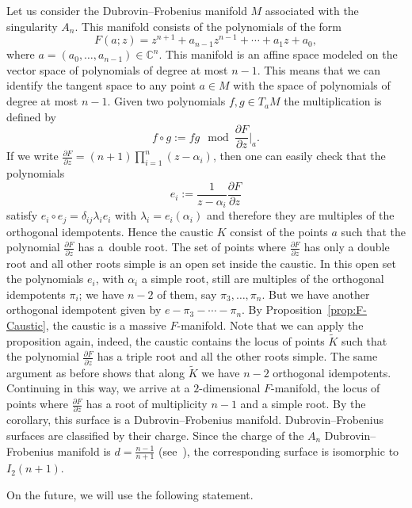 \documentclass[10pt,a4paper]{amsart}
\numberwithin{equation}{section}
\begin{document}
\begin{Example}
 Let us consider the Dubrovin--Frobenius manifold $M$ associated with the singularity $A_{n}$. This manifold consists of the polynomials of the form
 \begin{equation*}
 F(a;z)=z^{n+1}+a_{n-1}z^{n-1}+\cdots + a_{1}z + a_{0},
 \end{equation*}
 where $a=(a_{0},\dots,a_{n-1})\in\mathbb{C}^{n}$. This manifold is an affine space modeled on the vector space of polynomials of degree at most $n-1$. This means that we can identify the tangent space to any point $a\in M$ with the space of polynomials of degree at most $n-1$. Given two polynomials $f,g\in T_{a}M$ the multiplication is defined by
 \begin{equation*}
 f\circ g:= fg \mod \frac{\partial F}{\partial z}\bigg|_{a}.
 \end{equation*}
 If we write $\frac{\partial F}{\partial z}=(n+1)\prod_{i=1}^{n}(z-\alpha_{i})$, then one can easily check that the polynomials
 \begin{equation*}
 e_{i}:=\frac{1}{z-\alpha_{i}}\frac{\partial F}{\partial z}
 \end{equation*}
satisfy $e_{i}\circ e_{j}=\delta_{ij}\lambda_{i}e_{i}$ with $\lambda_{i}=e_{i}(\alpha_{i})$ and therefore they are multiples of the orthogonal idempotents. Hence the caustic $K$ consist of the points $a$ such that the polynomial $\frac{\partial F}{\partial z}$ has a~double root. The set of points where $\frac{\partial F}{\partial z}$ has only a double root and all other roots simple is an open set inside the caustic. In this open set the polynomials $e_{i}$, with $\alpha_{i}$ a simple root, still are multiples of the orthogonal idempotents $\pi_{i}$; we have $n-2$ of them, say $\pi_{3},\dots,\pi_{n}$. But we have another orthogonal idempotent given by $e-\pi_{3}-\cdots-\pi_{n}$. By Proposition~\ref{prop:F-Caustic}, the caustic is a massive $F$-manifold. Note that we can apply the proposition again, indeed, the caustic contains the locus of points $\tilde{K}$ such that the polynomial $\tfrac{\partial F}{\partial z}$ has a triple root and all the other roots simple. The same argument as before shows that along $\tilde{K}$ we have $n-2$ orthogonal idempotents. Continuing in this way, we arrive at a $2$-dimensional $F$-manifold, the locus of points where $\tfrac{\partial F}{\partial z}$ has a root of multiplicity $n-1$ and a simple root. By the corollary, this surface is a Dubrovin--Frobenius manifold. Dubrovin--Frobenius surfaces are classified by their charge. Since the charge of the $A_{n}$ Dubrovin--Frobenius manifold is $d=\frac{n-1}{n+1}$ (see~\cite{Dubrovin:1993nt}), the corresponding surface is isomorphic to $I_{2}(n+1)$.
\end{Example}
On the future, we will use the following statement.
\end{document}
